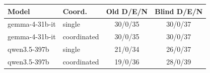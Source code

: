 \begin{tabular}{@{}llcc@{}}
\toprule
Model & Coord. & Old D/E/N & Blind D/E/N \\\midrule
gemma-4-31b-it & single & 30/0/35 & 30/0/37 \\
gemma-4-31b-it & coordinated & 30/0/35 & 30/0/37 \\
qwen3.5-397b & single & 21/0/34 & 26/0/37 \\
qwen3.5-397b & coordinated & 19/0/36 & 28/0/39 \\
\bottomrule
\end{tabular}
